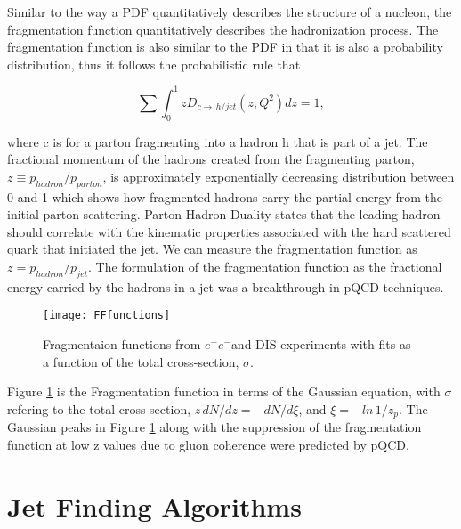 Similar to the way a PDF quantitatively describes the structure of a nucleon, the fragmentation function quantitatively describes the hadronization process.  The fragmentation function is also similar to the PDF in that it is also a probability distribution, thus it follows the probabilistic rule that

\begin{equation}
\sum \int_{0}^{1} z D_{c \rightarrow \, h/jet} (z,Q^{2})dz = 1,
\label{eq:FFRule}
\end{equation}

\noindent
where c is for a parton fragmenting into a hadron h that is part of a jet.  The fractional momentum of the hadrons created from the fragmenting parton, $z \equiv p_{hadron} / p_{parton}$, is approximately exponentially decreasing distribution between 0 and 1 which shows how fragmented hadrons carry the partial energy from the initial parton scattering.  Parton-Hadron Duality\cite{Jenkovszky:2012dc} states that the leading hadron should correlate with the kinematic properties associated with the hard scattered quark that initiated the jet.  We can measure the fragmentation function as $z = p_{hadron} / p_{jet}$.  The formulation of the fragmentation function as the fractional energy carried by the hadrons in a jet was a breakthrough in pQCD techniques.

\begin{figure}[h]
\texttt{[image: FFfunctions]}
\centering
\caption{Fragmentaion functions from $e^{+}e^{-}$and DIS experiments with fits\cite{rak_tannenbaum_2013} as a function of the total cross-section, $\sigma$.}
\label{fig:FFfunc}
\end{figure}


Figure \ref{fig:FFfunc} is the Fragmentation function in terms of the Gaussian equation, with $\sigma$ refering to the total cross-section, $z \, dN/dz = - dN /d \xi $, and $\xi = -ln  \,1/z_{p}$. The Gaussian peaks in Figure \ref{fig:FFfunc} along with the suppression of the fragmentation function at low z values due to gluon coherence were predicted by pQCD. 

\section{Jet Finding Algorithms}

